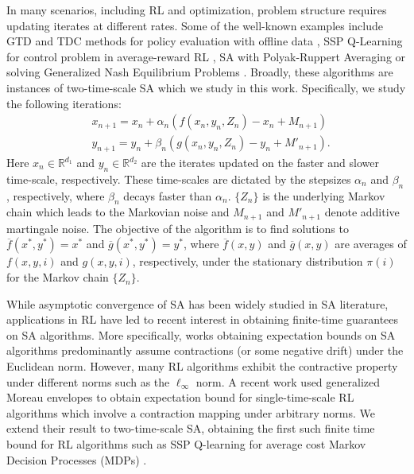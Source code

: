 \documentclass[letterpaper, 10 pt, conference]{ieeeconf}  %
\theoremstyle{definition}
\theoremstyle{plain}
\newcommand{\barf}{\overline{f}}
\newcommand{\barg}{\overline{g}}
\newcommand{\xstar}{x^*}
\newcommand{\ystar}{y^*}
\newcommand{\RR}{\mathbb{R}}
\begin{document}
In many scenarios, including RL and optimization, problem structure requires updating iterates at different rates. Some of the well-known examples include GTD and TDC methods for policy evaluation with offline data \cite{sutton2018}, SSP Q-Learning for control problem in average-reward RL \cite{abounadi}, SA with Polyak-Ruppert Averaging \cite{polyak1992acceleration} or solving Generalized Nash Equilibrium Problems \cite{GNEP}. Broadly, these algorithms are instances of two-time-scale SA which we study in this work. Specifically, we study the following iterations:
\begin{equation*}
    \begin{aligned}
&x_{n+1}=x_n+\alpha_n (f(x_n,y_n,Z_n)-x_n+M_{n+1})\\
&y_{n+1}=y_n+\beta_n (g(x_n,y_n,Z_n)-y_n+M'_{n+1}).
\end{aligned}
\end{equation*}
Here $x_n\in\RR^{d_1}$ and $y_n\in\RR^{d_2}$ are the iterates updated on the faster and slower time-scale, respectively. These time-scales are dictated by the stepsizes $\alpha_n$ and $\beta_n$, respectively, where $\beta_n$ decays faster than $\alpha_n$. $\{Z_n\}$ is the underlying Markov chain which leads to the Markovian noise and $M_{n+1}$ and $M'_{n+1}$ denote additive martingale noise. The objective of the algorithm is to find solutions to $\barf(\xstar,\ystar)=\xstar$ and $\barg(\xstar,\ystar)=\ystar$, where $\barf(x,y)$ and $\barg(x,y)$ are averages of $f(x,y,i)$ and $g(x,y,i)$, respectively, under the stationary distribution $\pi(i)$ for the Markov chain $\{Z_n\}$.

While asymptotic convergence of SA has been widely studied in SA literature, applications in RL have led to recent interest in obtaining finite-time guarantees on SA algorithms. More specifically, works obtaining expectation bounds on SA algorithms predominantly assume contractions (or some negative drift) under the Euclidean norm. However, many RL algorithms exhibit the contractive property under different norms such as the $\ell_\infty$ norm. A recent work \cite{chenfinite} used generalized Moreau envelopes to obtain expectation bound for single-time-scale RL algorithms which involve a contraction mapping under arbitrary norms. We extend their result to two-time-scale SA, obtaining the first such finite time bound for RL algorithms such as SSP Q-learning for average cost Markov Decision Processes (MDPs) \cite{abounadi}.
\end{document}
